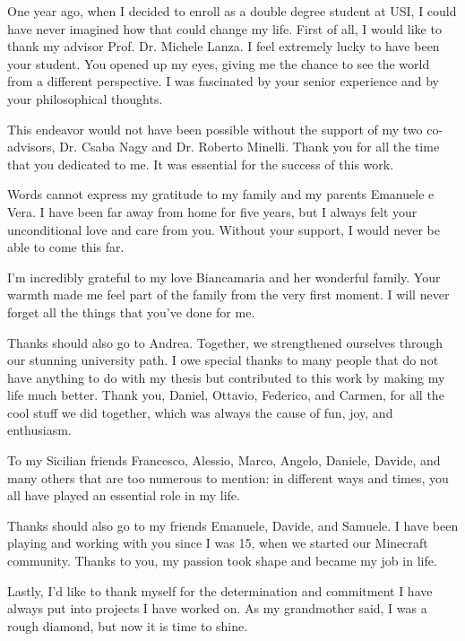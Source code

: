 
\begin{acknowledgements}

\addchaptertocentry{\acknowledgementname}
One year ago, when I decided to enroll as a double degree student at USI, I could have never imagined how that could change my life. First of all, I would like to thank my advisor Prof. Dr. Michele Lanza. I feel extremely lucky to have been your student. You opened up my eyes, giving me the chance to see the world from a different perspective. I was fascinated by your senior experience and by your philosophical thoughts. 

This endeavor would not have been possible without the support of my two co-advisors, Dr. Csaba Nagy and Dr. Roberto Minelli. Thank you for all the time that you dedicated to me. It was essential for the success of this work.

Words cannot express my gratitude to my family and my parents Emanuele e Vera. I have been far away from home for five years, but I always felt your unconditional love and care from you. Without your support, I would never be able to come this far. 

I’m incredibly grateful to my love Biancamaria and her wonderful family. Your warmth made me feel part of the family from the very first moment. I will never forget all the things that you've done for me.   

Thanks should also go to Andrea. Together, we strengthened ourselves through our stunning university path. 
I owe special thanks to many people that do not have anything to do with my thesis but contributed to this work by making my life much better. Thank you, Daniel, Ottavio, Federico, and Carmen, for all the cool stuff we did together, which was always the cause of fun, joy, and enthusiasm.

To my Sicilian friends Francesco, Alessio, Marco, Angelo, Daniele, Davide, and many others that are too numerous to mention: in different ways and times, you all have played an essential role in my life. 

Thanks should also go to my friends Emanuele, Davide, and Samuele. I have been playing and working with you since I was 15, when we started our Minecraft community. Thanks to you, my passion took shape and became my job in life.

Lastly, I’d like to thank myself for the determination and commitment I have always put into projects I have worked on. As my grandmother said, I was a rough diamond, but now it is time to shine. 


\end{acknowledgements}
